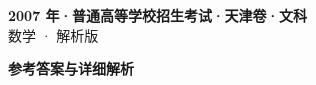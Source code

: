 \documentclass[zihao=-4, a4paper]{ctexart}
\begin{document}
\begin{center}
  {\Large\bfseries 2007 年·普通高等学校招生考试·天津卷·文科}\\[4pt]
  {\large 数学 · 解析版}
\end{center}
\medskip
{}

\clearpage
{}
\begin{center}{\Large\bfseries 参考答案与详细解析}\end{center}
\medskip

\end{document}
